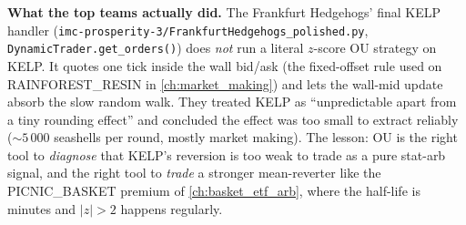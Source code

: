 \begin{prosperitybox}[title={Prosperity example: KELP}]
\textbf{What the top teams actually did.} The Frankfurt
Hedgehogs' final KELP handler
(\texttt{imc-prosperity-3/FrankfurtHedgehogs\_polished.py},
\texttt{DynamicTrader.get\_orders()}) does \emph{not} run a
literal $z$-score OU strategy on KELP. It quotes one tick inside
the wall bid/ask (the fixed-offset rule used on
RAINFOREST\_RESIN in \cref{ch:market_making}) and lets the
wall-mid update absorb the slow random walk. They treated KELP
as ``unpredictable apart from a tiny rounding effect'' and
concluded the effect was too small to extract reliably
($\sim 5\,000$ seashells per round, mostly market making). The
lesson: OU is the right tool to \emph{diagnose} that KELP's
reversion is too weak to trade as a pure stat-arb signal, and
the right tool to \emph{trade} a stronger mean-reverter like the
PICNIC\_BASKET premium of \cref{ch:basket_etf_arb}, where the
half-life is minutes and $|z| > 2$ happens regularly.
\end{prosperitybox}

